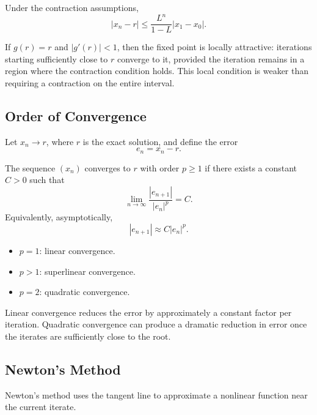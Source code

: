 \begin{theorem}
  Under the contraction assumptions,
  \[
    \boxed{
      |x_n-r|\leq
      \frac{L^n}{1-L}|x_1-x_0|.
    }
  \]
\end{theorem}

\begin{remark}
  If \(g(r)=r\) and \(|g'(r)|<1\), then the fixed point is locally attractive: iterations starting sufficiently close to \(r\) converge to it, provided the iteration remains in a region where the contraction condition holds. This local condition is weaker than requiring a contraction on the entire interval.
\end{remark}

\subsection{Order of Convergence}

Let \(x_n\to r\), where \(r\) is the exact solution, and define the error
\[
  e_n=x_n-r.
\]

\begin{definition}
  The sequence \((x_n)\) converges to \(r\) with order \(p\geq1\) if there exists a constant \(C>0\) such that
  \[
    \boxed{
      \lim_{n\to\infty}
      \frac{|e_{n+1}|}{|e_n|^p}=C.
    }
  \]
  Equivalently, asymptotically,
  \[
    |e_{n+1}|\approx C|e_n|^p.
  \]
\end{definition}

\begin{itemize}
  \item \(p=1\): linear convergence.
  \item \(p>1\): superlinear convergence.
  \item \(p=2\): quadratic convergence.
\end{itemize}

\begin{remark}
  Linear convergence reduces the error by approximately a constant factor per iteration. Quadratic convergence can produce a dramatic reduction in error once the iterates are sufficiently close to the root.
\end{remark}

\subsection{Newton's Method}

Newton's method uses the tangent line to approximate a nonlinear function near the current iterate.


